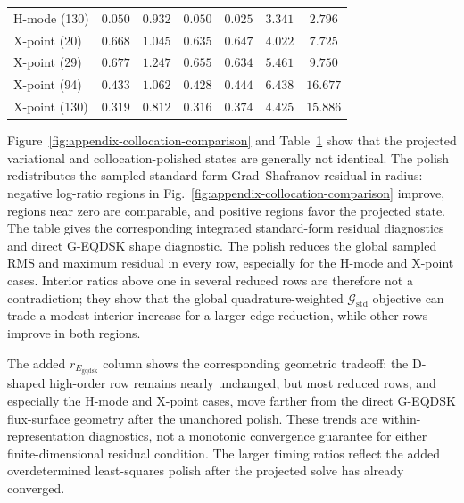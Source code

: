 \documentclass[final, 3p, times]{elsarticle}
\begin{document}
\begin{table}[tb]
\begin{tabular}{l c c c c c c}
        H-mode (130)  & $0.050$                & $0.932$                 & $0.050$                    & $0.025$                                   & $3.341$                  & $2.796$            \\
        X-point (20)  & $0.668$                & $1.045$                 & $0.635$                    & $0.647$                                   & $4.022$                  & $7.725$            \\
        X-point (29)  & $0.677$                & $1.247$                 & $0.655$                    & $0.634$                                   & $5.461$                  & $9.750$            \\
        X-point (94)  & $0.433$                & $1.062$                 & $0.428$                    & $0.444$                                   & $6.438$                  & $16.677$           \\
        X-point (130) & $0.319$                & $0.812$                 & $0.316$                    & $0.374$                                   & $4.425$                  & $15.886$           \\
        \hline
    \end{tabular}
    \label{tab:appendix-collocation-ratios}
\end{table}

Figure~\ref{fig:appendix-collocation-comparison} and Table~\ref{tab:appendix-collocation-ratios} show that the projected variational and collocation-polished states are generally not identical. The polish redistributes the sampled standard-form Grad--Shafranov residual in radius: negative log-ratio regions in Fig.~\ref{fig:appendix-collocation-comparison} improve, regions near zero are comparable, and positive regions favor the projected state. The table gives the corresponding integrated standard-form residual diagnostics and direct G-EQDSK shape diagnostic. The polish reduces the global sampled RMS and maximum residual in every row, especially for the H-mode and X-point cases. Interior ratios above one in several reduced rows are therefore not a contradiction; they show that the global quadrature-weighted $\mathcal{G}_{\mathrm{std}}$ objective can trade a modest interior increase for a larger edge reduction, while other rows improve in both regions.

The added $r_{E_{\mathrm{gqdsk}}}$ column shows the corresponding geometric tradeoff: the D-shaped high-order row remains nearly unchanged, but most reduced rows, and especially the H-mode and X-point cases, move farther from the direct G-EQDSK flux-surface geometry after the unanchored polish. These trends are within-representation diagnostics, not a monotonic convergence guarantee for either finite-dimensional residual condition. The larger timing ratios reflect the added overdetermined least-squares polish after the projected solve has already converged.
\end{document}
